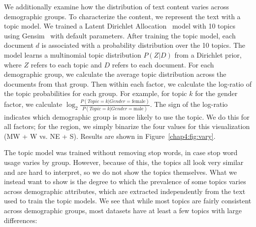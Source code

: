 We additionally examine how the distribution of text content varies across demographic groups. To characterize the content, we represent the text with a topic model.
We trained a Latent Dirichlet Allocation~\cite{blei2003latent} model with 10 topics using Gensim~\cite{rehurek2010software} with default parameters.
After training the topic model, each document $d$ is associated with a probability distribution over the 10 topics. 
The model learns a multinomial topic distribution $P(Z|D)$ from a Dirichlet prior, where $Z$ refers to each topic and $D$ refers to each document.
For each demographic group, we calculate the average topic distribution across the documents from that group.
Then within each factor, we calculate the log-ratio of the topic probabilities for each group.
For example, for topic $k$ for the gender factor,
we calculate $\log_2 \frac{P(Topic=k|Gender=\textrm{female})}{P(Topic=k|Gender=\textrm{male})}$.
The sign of the log-ratio indicates which demographic group is more likely to use the topic.
We do this for all factors;
for the region, we simply binarize the four values for this visualization (MW + W vs. NE + S).
Results are shown in Figure~\ref{chap4:fig:vary}.

The topic model was trained without removing stop words, in case stop word usage varies by group.
However, because of this, the topics all look very similar and are hard to interpret, so we do not show the topics themselves.
What we instead want to show is the degree to which the prevalence of some topics varies across demographic attributes, which are extracted independently from the text used to train the topic models.
We see that while most topics are fairly consistent across demographic groups, most datasets have at least a few topics with large differences:

